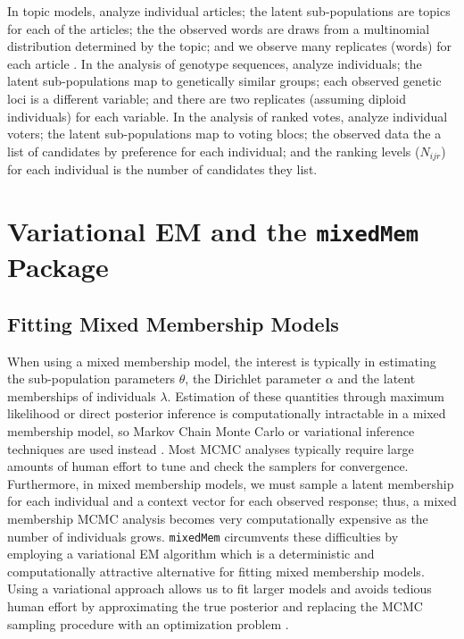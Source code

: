 \documentclass{article}\usepackage[]{graphicx}\usepackage[]{color}
\begin{document}
In topic models, \cite{LDA, erosheva2004mixed} analyze individual articles; the latent sub-populations are topics for each of the articles; the the observed words are draws from a multinomial distribution determined by the topic; and we observe many replicates (words) for each article . In the analysis of genotype sequences, \cite{pritchard2000inference} analyze individuals; the latent sub-populations map to genetically similar groups; each observed genetic loci is a different variable; and there are two replicates (assuming diploid individuals) for each variable. In the analysis of ranked votes, \cite{gormley2009grade} analyze individual voters; the latent sub-populations map to voting blocs; the observed data the a list of candidates by preference for each individual; and the ranking levels ($N_{ijr}$) for each individual is the number of candidates they list.     

\section{Variational EM and the \texttt{mixedMem} Package}\label{variational}

\subsection{Fitting Mixed Membership Models}
When using a mixed membership model, the interest is typically in estimating the sub-population parameters $\theta$, the Dirichlet parameter $\alpha$ and the latent memberships of individuals $\lambda$. Estimation of these quantities through maximum likelihood or direct posterior inference is computationally intractable in a mixed membership model, so Markov Chain Monte Carlo or variational inference techniques are used instead \citep{airoldi2009mixed}. Most MCMC analyses typically require large amounts of human effort to tune and check the samplers for convergence. Furthermore, in mixed membership models, we must sample a latent membership for each individual and a context vector for each observed response; thus, a mixed membership MCMC analysis becomes very computationally expensive as the number of individuals grows. \texttt{mixedMem} circumvents these difficulties by employing a variational EM algorithm which is a deterministic and computationally attractive alternative for fitting mixed membership models. Using a variational approach allows us to fit larger models and avoids tedious human effort by approximating the true posterior and replacing the MCMC sampling procedure with an optimization problem \citep{beal2003variational}.  
\end{document}
